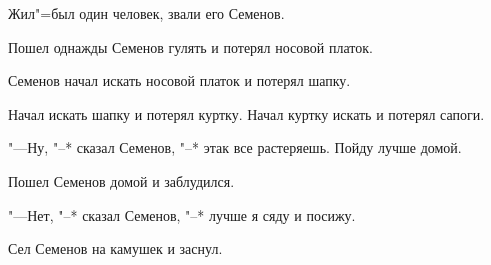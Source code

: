 
Жил"=был один человек, звали его Семенов.
    
Пошел  однажды  Семенов гулять и потерял
носовой платок.
    
Семенов  начал  искать  носовой платок и
потерял шапку.
    
Начал искать шапку и потерял куртку. Начал 
куртку искать и потерял сапоги.
    
"---Ну, "--* сказал Семенов, "--*  этак все растеряешь. 
Пойду лучше домой.
    
Пошел Семенов домой и заблудился.
    
"---Нет, "--* сказал Семенов, "--*  лучше я сяду
и посижу.
    
Сел Семенов на камушек и заснул.
